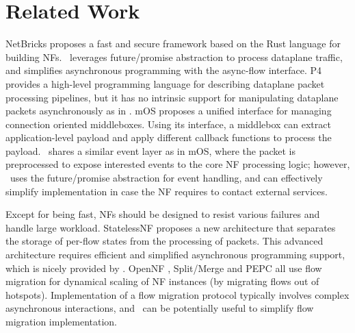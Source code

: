 \section{Related Work}

NetBricks proposes a fast and secure framework based on the Rust \cite{199352} language for building NFs. %
\netstar~leverages future/promise abstraction to process dataplane traffic, and simplifies asynchronous programming with the async-flow interface.
P4 \cite{bosshart2014p4} provides a high-level programming language for describing dataplane packet processing pipelines, but it has no intrinsic support for manipulating dataplane packets asynchronously as in \netstar. %
mOS \cite{201546} proposes a unified interface for managing connection oriented middleboxes. Using its interface, a middlebox can extract application-level payload and apply different callback functions to process the payload. \netstar~shares a similar event layer as in mOS, where the packet is preprocessed to expose interested events to the core NF processing logic; however, \netstar~uses the future/promise abstraction for event handling, and can effectively simplify implementation in case the NF requires to contact external services.

Except for being fast, NFs should be designed to resist various failures and handle large workload. %
StatelessNF \cite{201545} proposes a new architecture that separates the storage of per-flow states from the processing of packets. This advanced architecture requires efficient and simplified asynchronous programming support, which is nicely provided by \netstar. OpenNF \cite{gember2014opennf}, Split/Merge \cite{rajagopalan2013split} and PEPC \cite{Qazi:2017:HPP:3098822.3098848} all use flow migration for dynamical scaling of NF instances (by migrating flows out of hotspots). Implementation of a flow migration protocol typically involves complex asynchronous interactions, and \netstar~can be potentially useful to simplify flow migration implementation.

